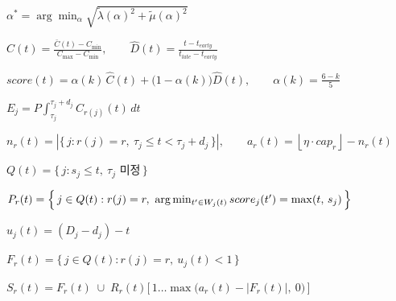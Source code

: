 $\alpha^{*} = \arg\min_{\alpha} \sqrt{ \tilde{\lambda}(\alpha)^{2} + \tilde{\mu}(\alpha)^{2} }$

$\hat{C}(t) = \frac{\bar{C}(t) - C_{\min}}{C_{\max} - C_{\min}}, \qquad \hat{D}(t) = \frac{t - t_{early}}{t_{late} - t_{early}}$

$score(t) = \alpha(k)\, \hat{C}(t) + \bigl(1 - \alpha(k)\bigr) \hat{D}(t), \qquad \alpha(k) = \frac{6 - k}{5}$

$E_j = P \int_{\tau_j}^{\tau_j + d_j} C_{r(j)}(t)\, dt$



$n_r(t) = \left| \{\, j : r(j) = r,\ \tau_j \le t < \tau_j + d_j \,\} \right|, \qquad a_r(t) = \left\lfloor \eta \cdot cap_r \right\rfloor - n_r(t)$

$Q(t) = \{\, j : s_j \le t,\ \tau_j \text{ 미정} \,\}$

$P_r(t) = \Bigl\{\, j \in Q(t) : r(j) = r,\ \arg\min_{t' \in W_j(t)} score_j(t') = \max(t,\, s_j) \,\Bigr\}$

$u_j(t) = (D_j - d_j) - t$

$F_r(t) = \{\, j \in Q(t) : r(j) = r,\ u_j(t) < 1 \,\}$

$S_r(t) = F_r(t) \;\cup\; R_r(t)\bigl[\,1 \ldots \max\bigl(a_r(t) - |F_r(t)|,\ 0\bigr)\,\bigr]$




